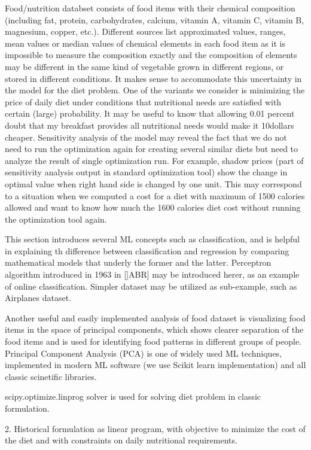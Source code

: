 {{{Food/nutrition databset consists of food items with their chemical composition (including fat, protein, carbohydrates, calcium, vitamin A, vitamin C, vitamin B, magnesium, copper, etc.). Different sources list approximated values, ranges, mean values or median values of chemical elements in each food item as it is impossible to measure the composition exactly and the composition of elements may be different in the same kind of vegetable grown in different regions, or stored in different conditions. It makes sense to accommodate this uncertainty in the model for the diet problem. One of the variants we consider is minimizing the price of daily diet under conditions that nutritional needs are satisfied with certain (large) probability. It may be useful to know that allowing 0.01 percent  doubt that my breakfast provides all nutritional needs would make it 10dollars  cheaper. 
Sensitivity analysis of the model may reveal the fact that we do not need to run the optimization again for creating several similar diets but need to analyze the result of single optimization run. For example, shadow prices (part of sensitivity analysis output in standard optimization tool) show the change in optimal value when right hand side is changed by one unit. This may correspond to a situation when we computed a cost for a diet with maximum of 1500 calories allowed and want to know how much the 1600 calories diet cost without running the optimization tool again.  


This section introduces several ML concepts such as classification, and is helpful in explaining th difference between classification and regression by comparing mathematical models that underly the former and the latter. Perceptron algorithm introduced in 1963 in []ABR] may be introduced herer, as an example of online classification. Simpler dataset may be utilized as sub-example, such as Airplanes dataset.

Another useful and easily implemented analysis  of food dataset is visualizing food items in the space of principal components,  which shows clearer separation of the food items and is used for identifying food patterns in different groups of people. Principal Component Analysis (PCA) is one of widely used ML techniques, implemented in modern ML software (we use Scikit learn implementation) and all classic scinetific libraries. 

scipy.optimize.linprog solver is used for solving diet problem in classic formulation.


2. Historical formulation as linear program, with objective to minimize the cost of the diet and with constraints on daily nutritional requirements.

}}}
